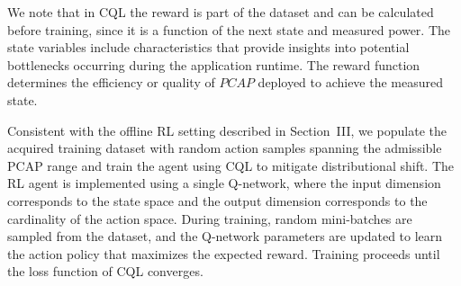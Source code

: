 We note that in CQL the reward is part of the dataset and can be calculated before training, since it is a function of the next state and measured power.
The state variables include characteristics that provide insights into potential bottlenecks occurring during the application runtime. The reward function determines the efficiency or quality of $PCAP$ deployed to achieve the measured state. 





Consistent with the offline RL setting described in Section~III, we populate the acquired training dataset with random action samples spanning the admissible PCAP range and train the agent using CQL to mitigate distributional shift. The RL agent is implemented using a single Q-network, where the input dimension corresponds to the state space and the output dimension corresponds to the cardinality of the action space. During training, random mini-batches are sampled from the dataset, and the Q-network parameters are updated to learn the action policy that maximizes the expected reward. Training proceeds until the loss function 
of CQL converges.



